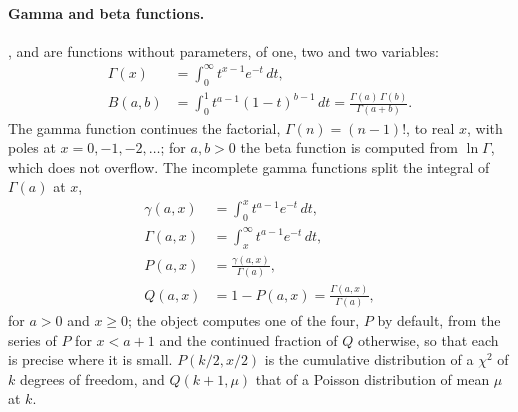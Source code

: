 \paragraph{Gamma and beta functions.}
,  and  are functions without parameters, of
one, two and two variables:
\begin{align}
  \Gamma(x) &= \int_0^\infty t^{x-1} e^{-t}\, dt, \qquad \\
  B(a,b) &= \int_0^1 t^{a-1}(1-t)^{b-1}\, dt = \frac{\Gamma(a)\,\Gamma(b)}{\Gamma(a+b)} .
\end{align}
The gamma function continues the factorial, $\Gamma(n) = (n-1)!$, to real $x$, with poles at $x = 0, -1, -2,
\dots$; for $a, b > 0$ the beta function is computed from $\ln\Gamma$, which does not overflow. The incomplete gamma
functions split the integral of $\Gamma(a)$ at $x$,
\begin{align}
  \gamma(a,x) &= \int_0^x t^{a-1} e^{-t}\, dt, \qquad \\
  \Gamma(a,x) &= \int_x^\infty t^{a-1} e^{-t}\, dt, \qquad\\
  P(a,x) &= \frac{\gamma(a,x)}{\Gamma(a)}, \qquad \\
  Q(a,x) &= 1 - P(a,x) = \frac{\Gamma(a,x)}{\Gamma(a)},
\end{align}
for $a > 0$ and $x \ge 0$; the object computes one of the four, $P$ by default, from the series of $P$ for
$x < a+1$ and the continued fraction of $Q$ otherwise, so that each is precise where it is small. $P(k/2, x/2)$ is the
cumulative distribution of a $\chi^2$ of $k$ degrees of freedom, and $Q(k+1,\mu)$ that of a Poisson distribution of
mean $\mu$ at $k$.

